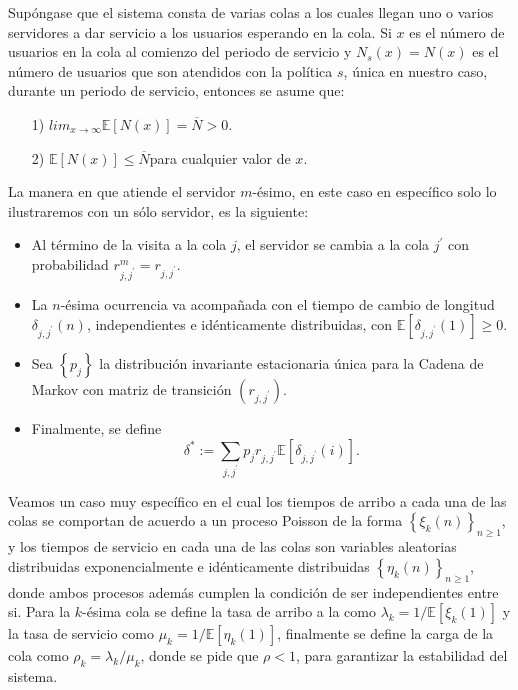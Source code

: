 \documentclass{article}
\newcommand{\esp}{\mathbb{E}}
\begin{document}
Sup\'ongase que el sistema consta de varias colas a los cuales llegan uno o varios servidores a dar servicio a los usuarios
esperando en la cola. Si $x$ es el n\'umero de usuarios en la cola al comienzo del periodo de servicio y $N_{s}\left(x\right)=N\left(x\right)$ es el n\'umero de usuarios que son atendidos con la pol\'itica $s$, \'unica en nuestro caso, durante un periodo de servicio, entonces se asume que:
\begin{itemize}
\item[1)]\label{S1}$lim_{x\rightarrow\infty}\esp\left[N\left(x\right)\right]=\overline{N}>0$.
\item[2)]\label{S2}$\esp\left[N\left(x\right)\right]\leq\overline{N}$para cualquier valor de $x$.
\end{itemize}
La manera en que atiende el servidor $m$-\'esimo, en este caso en espec\'ifico solo lo ilustraremos con un s\'olo servidor, es la siguiente:
\begin{itemize}
\item Al t\'ermino de la visita a la cola $j$, el servidor se cambia a la cola $j^{'}$ con probabilidad $r_{j,j^{'}}^{m}=r_{j,j^{'}}$.

\item La $n$-\'esima ocurrencia va acompa\~nada con el tiempo de cambio de longitud $\delta_{j,j^{'}}\left(n\right)$, independientes e id\'enticamente distribuidas, con $\esp\left[\delta_{j,j^{'}}\left(1\right)\right]\geq0$.

\item Sea $\left\{p_{j}\right\}$ la distribuci\'on invariante estacionaria \'unica para la Cadena de Markov con matriz de transici\'on $\left(r_{j,j^{'}}\right)$.

\item Finalmente, se define
\begin{equation}
\delta^{*}:=\sum_{j,j^{'}}p_{j}r_{j,j^{'}}\esp\left[\delta_{j,j^{'}}\left(i\right)\right].
\end{equation}
\end{itemize}

Veamos un caso muy espec\'ifico en el cual los tiempos de arribo a cada una de las colas se comportan de acuerdo a un proceso Poisson de la forma $\left\{\xi_{k}\left(n\right)\right\}_{n\geq1}$, y los tiempos de servicio en cada una de las colas son variables aleatorias distribuidas exponencialmente e id\'enticamente distribuidas $\left\{\eta_{k}\left(n\right)\right\}_{n\geq1}$, donde ambos procesos adem\'as cumplen la condici\'on de ser independientes entre si. Para la $k$-\'esima cola se define la tasa de arribo a la como $\lambda_{k}=1/\esp\left[\xi_{k}\left(1\right)\right]$ y la tasa de servicio como $\mu_{k}=1/\esp\left[\eta_{k}\left(1\right)\right]$, finalmente se define la carga de la cola como $\rho_{k}=\lambda_{k}/\mu_{k}$, donde se pide que $\rho<1$, para garantizar la estabilidad del sistema.\\
\end{document}
